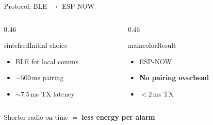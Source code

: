 \begin{frame}{Protocol: BLE $\rightarrow$ ESP-NOW}
\begin{columns}[T,onlytextwidth]
\begin{column}{0.46\textwidth}
  \begin{colorblock}[white]{sintefred}{Initial choice}
  \large
  \begin{itemize}
    \item BLE for local comms
    \item $\sim500$\,ms pairing
    \item $\sim7.5$\,ms TX latency
  \end{itemize}
  \end{colorblock}
\end{column}
\begin{column}{0.46\textwidth}
  \begin{colorblock}[white]{maincolor}{Result}
  \large
  \begin{itemize}
    \item ESP-NOW
    \item \textbf{No pairing overhead}
    \item $<2$\,ms TX
  \end{itemize}
  \end{colorblock}
\end{column}
\end{columns}
\vspace{0.5cm}
\centering
{\Large Shorter radio-on time $=$ \textbf{less energy per alarm}}
\end{frame}
